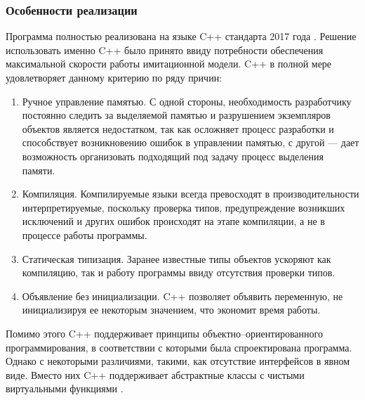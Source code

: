 \subsubsection{Особенности реализации}
Программа полностью реализована на языке C++ стандарта 2017 года \cite{o2017mastering}. Решение использовать именно C++ было принято ввиду потребности обеспечения максимальной скорости работы имитационной модели. C++ в полной мере удовлетворяет данному критерию по ряду причин:
\begin{enumerate}
	\item Ручное управление памятью. С одной стороны, необходимость разработчику постоянно следить за выделяемой памятью и разрушением экземпляров объектов является недостатком, так как осложняет процесс разработки и способствует возникновению ошибок в управлении памятью, с другой --- дает возможность организовать подходящий под задачу процесс выделения памяти.
	\item Компиляция. Компилируемые языки всегда превосходят в производительности интерпретируемые, поскольку проверка типов, предупреждение возникших исключений и других ошибок происходят на этапе компиляции, а не в процессе работы программы.
	\item Статическая типизация. Заранее известные типы объектов ускоряют как компиляцию, так и работу программы ввиду отсутствия проверки типов.
	\item Объявление без инициализации. C++ позволяет объявить переменную, не инициализируя ее некоторым значением, что экономит время работы.
\end{enumerate}
Помимо этого C++ поддерживает принципы объектно--ориентированного программирования, в соответствии с которыми была спроектирована программа. Однако с некоторыми различиями, такими, как отсутствие интерфейсов в явном виде. Вместо них C++ поддерживает абстрактные классы с чистыми виртуальными функциями \cite{schmid2012c++}.

